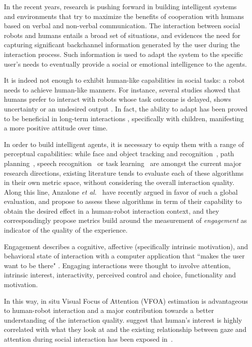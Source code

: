 \documentclass{sig-alternate}
\newcommand{\etal}{\textit{et al.}\xspace}
\begin{document}
In the recent years, research is pushing forward in building intelligent systems and environments that try to maximize the benefits of cooperation with humans based on verbal and non-verbal communication. The interaction between social robots and humans entails a broad set of situations, and evidences the need for capturing significant backchannel information generated by the user during the interaction process. Such information is used to adapt the system to the specific user's needs to eventually provide a social or emotional intelligence to the agents.

It is indeed not enough to exhibit human-like capabilities in social tasks: a robot needs to achieve human-like manners. For instance, several studies showed that humans prefer to interact with robots whose task outcome is delayed, shows uncertainty or an undesired output \cite{Admoni,Short}. In fact, the ability to adapt has been proved to be beneficial in long-term interactions \cite{Tielman:2014, Lim:2014}, specifically with children, manifesting a more positive attitude over time.

In order to build intelligent agents, it is necessary to equip them with a range of perceptual capabilities: while face and object tracking and recognition~\cite{Zhao:2003, Jafri:2014}, path planning~\cite{Galceran:2013}, speech recognition~\cite{brick2007incremental} or task learning~\cite{calinon2007learning} are amongst the current major research directions, existing literature tends to evaluate each of these algorithms in their own metric space, without considering the overall interaction quality. Along this line, Anzalone \etal~\cite{anzalone} have recently argued in favor of such a global evaluation, and propose to assess these algorithms in term of their capability to obtain the desired effect in a human-robot interaction context, and they correspondingly propose metrics build around the measurement of \emph{engagement} as indicator of the quality of the experience.

Engagement describes a cognitive, affective (specifically intrinsic motivation), and behavioral state of interaction with a computer application that ``makes the user want to be there" \cite{OBrien:2010}. Engaging interactions were thought to involve attention, intrinsic interest, interactivity, perceived control and choice, functionality and motivation.

In this way, in situ Visual Focus of Attention (VFOA) estimation is advantageous to human-robot interaction and a major contribution towards a better understanding of the interaction quality.\cite{yarbus1967eye, barber1976perception} suggest that human's interest is highly correlated with what they look at and the existing relationship between gaze and attention during social interaction has been exposed in~\cite{argyle1969social}.
\end{document}

